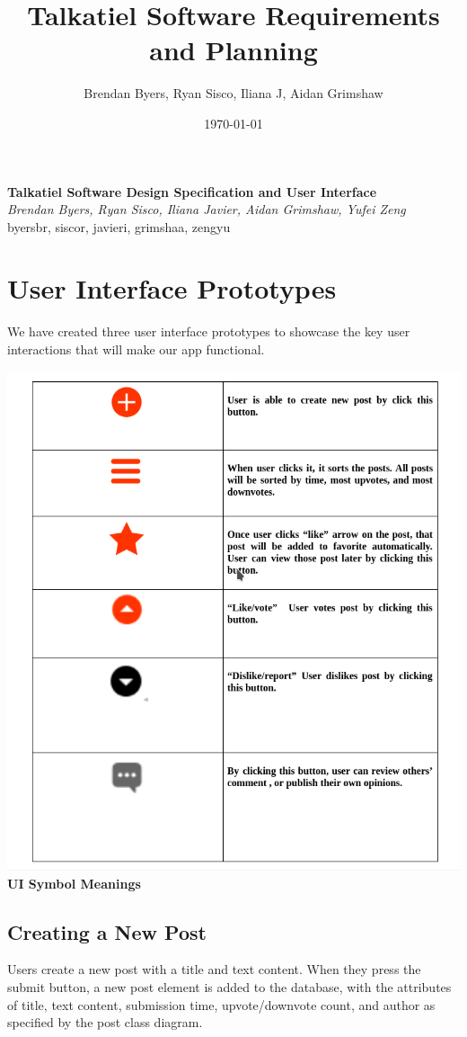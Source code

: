 \documentclass[12pt]{article}
\title{Talkatiel Software Requirements and Planning}
\author{Brendan Byers, Ryan Sisco, Iliana J, Aidan Grimshaw}
\date{\today}
\begin{document}
\begin{center}
      \Large\textbf{Talkatiel Software Design Specification and User Interface}\\
      \large\textit{Brendan Byers, Ryan Sisco, Iliana Javier, Aidan Grimshaw, Yufei Zeng}\\
      \large{byersbr, siscor, javieri, grimshaa, zengyu}\\
   \end{center}

\tableofcontents
\pagebreak
\section{User Interface Prototypes}
We have created three user interface prototypes to showcase the key user interactions that will make our app functional.

\begin{center}
\includegraphics[scale=0.60]{img/ui/uiTable}\linebreak
\textbf{UI Symbol Meanings}
  \end{center}
\pagebreak

\subsection{Creating a New Post}
Users create a new post with a title and text content. When they press the submit button, a new post element is added to the database, with the attributes of title, text content, submission time, upvote/downvote count, and author as specified by the post class diagram.
\end{document}
